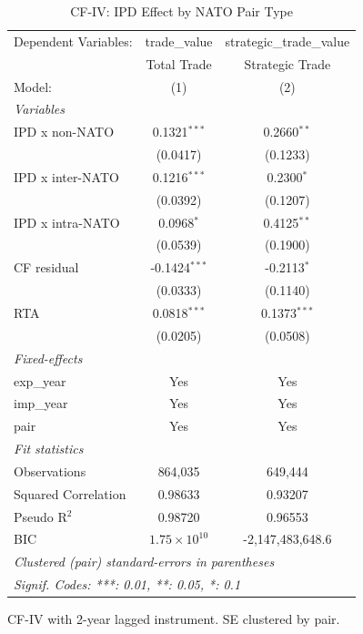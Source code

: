 
\begin{table}[htbp]
   \caption{CF-IV: IPD Effect by NATO Pair Type}
   \centering
   \begin{tabular}{lcc}
      \tabularnewline \midrule \midrule
      Dependent Variables: & trade\_value          & strategic\_trade\_value\\    
                           & Total Trade           & Strategic Trade \\   
      Model:               & (1)                   & (2)\\  
      \midrule
      \emph{Variables}\\
      IPD x non-NATO       & 0.1321$^{***}$        & 0.2660$^{**}$\\   
                           & (0.0417)              & (0.1233)\\   
      IPD x inter-NATO     & 0.1216$^{***}$        & 0.2300$^{*}$\\   
                           & (0.0392)              & (0.1207)\\   
      IPD x intra-NATO     & 0.0968$^{*}$          & 0.4125$^{**}$\\   
                           & (0.0539)              & (0.1900)\\   
      CF residual          & -0.1424$^{***}$       & -0.2113$^{*}$\\   
                           & (0.0333)              & (0.1140)\\   
      RTA                  & 0.0818$^{***}$        & 0.1373$^{***}$\\   
                           & (0.0205)              & (0.0508)\\   
      \midrule
      \emph{Fixed-effects}\\
      exp\_year            & Yes                   & Yes\\  
      imp\_year            & Yes                   & Yes\\  
      pair                 & Yes                   & Yes\\  
      \midrule
      \emph{Fit statistics}\\
      Observations         & 864,035               & 649,444\\  
      Squared Correlation  & 0.98633               & 0.93207\\  
      Pseudo R$^2$         & 0.98720               & 0.96553\\  
      BIC                  & $1.75\times 10^{10}$  & -2,147,483,648.6\\  
      \midrule \midrule
      \multicolumn{3}{l}{\emph{Clustered (pair) standard-errors in parentheses}}\\
      \multicolumn{3}{l}{\emph{Signif. Codes: ***: 0.01, **: 0.05, *: 0.1}}\\
   \end{tabular}
   
   \par \raggedright 
   CF-IV with 2-year lagged instrument. SE clustered by pair.
\end{table}


